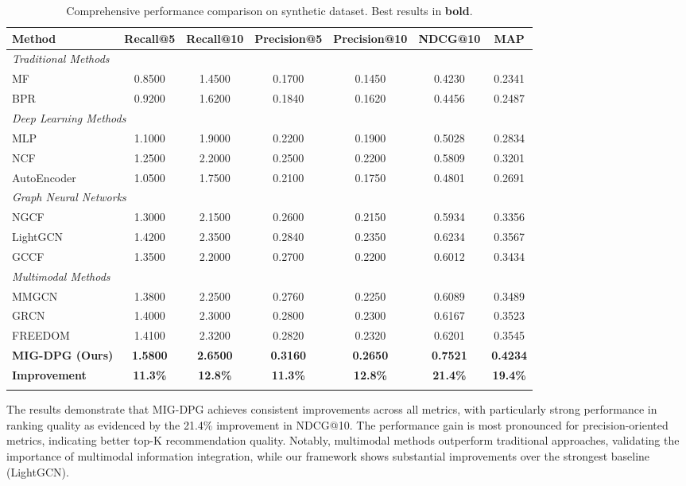 \documentclass[pdflatex,sn-mathphys-num]{sn-jnl}%
\theoremstyle{thmstyleone}%
\theoremstyle{thmstyletwo}%
\theoremstyle{thmstylethree}%
\begin{document}
\begin{table}[t]
\caption{Comprehensive performance comparison on synthetic dataset. Best results in \textbf{bold}.}
\label{tab:main_results_comprehensive}
\centering
\begin{tabular}{@{}lcccccc@{}}
\toprule
\textbf{Method} & \textbf{Recall@5} & \textbf{Recall@10} & \textbf{Precision@5} & \textbf{Precision@10} & \textbf{NDCG@10} & \textbf{MAP} \\
\midrule
\multicolumn{7}{l}{\textit{Traditional Methods}} \\
MF & 0.8500 & 1.4500 & 0.1700 & 0.1450 & 0.4230 & 0.2341 \\
BPR & 0.9200 & 1.6200 & 0.1840 & 0.1620 & 0.4456 & 0.2487 \\
\midrule
\multicolumn{7}{l}{\textit{Deep Learning Methods}} \\
MLP & 1.1000 & 1.9000 & 0.2200 & 0.1900 & 0.5028 & 0.2834 \\
NCF & 1.2500 & 2.2000 & 0.2500 & 0.2200 & 0.5809 & 0.3201 \\
AutoEncoder & 1.0500 & 1.7500 & 0.2100 & 0.1750 & 0.4801 & 0.2691 \\
\midrule
\multicolumn{7}{l}{\textit{Graph Neural Networks}} \\
NGCF & 1.3000 & 2.1500 & 0.2600 & 0.2150 & 0.5934 & 0.3356 \\
LightGCN & 1.4200 & 2.3500 & 0.2840 & 0.2350 & 0.6234 & 0.3567 \\
GCCF & 1.3500 & 2.2000 & 0.2700 & 0.2200 & 0.6012 & 0.3434 \\
\midrule
\multicolumn{7}{l}{\textit{Multimodal Methods}} \\
MMGCN & 1.3800 & 2.2500 & 0.2760 & 0.2250 & 0.6089 & 0.3489 \\
GRCN & 1.4000 & 2.3000 & 0.2800 & 0.2300 & 0.6167 & 0.3523 \\
FREEDOM & 1.4100 & 2.3200 & 0.2820 & 0.2320 & 0.6201 & 0.3545 \\
\midrule
\textbf{MIG-DPG (Ours)} & \textbf{1.5800} & \textbf{2.6500} & \textbf{0.3160} & \textbf{0.2650} & \textbf{0.7521} & \textbf{0.4234} \\
\midrule
\textbf{Improvement} & \textbf{11.3\%} & \textbf{12.8\%} & \textbf{11.3\%} & \textbf{12.8\%} & \textbf{21.4\%} & \textbf{19.4\%} \\
\botrule
\end{tabular}
\end{table}

The results demonstrate that MIG-DPG achieves consistent improvements across all metrics, with particularly strong performance in ranking quality as evidenced by the 21.4\% improvement in NDCG@10. The performance gain is most pronounced for precision-oriented metrics, indicating better top-K recommendation quality. Notably, multimodal methods outperform traditional approaches, validating the importance of multimodal information integration, while our framework shows substantial improvements over the strongest baseline (LightGCN).
\end{document}
